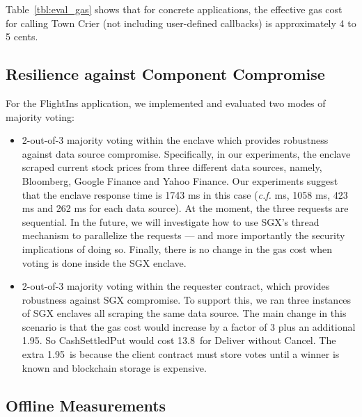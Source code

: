 Table~\ref{tbl:eval_gas} shows that for concrete applications, the effective gas cost
for calling Town Crier (not including user-defined callbacks) is approximately 4 to 5 cents.



\subsection{Resilience against Component Compromise}
\label{subsec:hedging}
For the {\sf FlightIns} application, 
we implemented and evaluated two modes of majority voting:
\begin{itemize}[leftmargin=3mm]
\item
2-out-of-3 majority voting within the enclave which provides robustness
against data source compromise.
Specifically, in our experiments, 
the enclave scraped current stock prices 
from three different data sources, 
namely, Bloomberg, Google Finance and Yahoo Finance.
Our experiments suggest that  
the enclave response time is 
1743 ms in this case ({\it c.f.} ms, 
1058 ms, 423 ms and 262  ms for 
each data source).
At the moment, the three requests 
are sequential. In the future, we will investigate how to 
use SGX's thread mechanism to parallelize the requests --- and more importantly
the security implications of doing so.
Finally, there is no change in the gas cost when voting is done
inside the SGX enclave.
\item
2-out-of-3 majority voting within the requester contract,
which provides robustness against 
SGX compromise.
To support this, we ran three instances of SGX enclaves all scraping
the same data source.  
The main change in this scenario is that 
the gas cost would increase by a factor of 3 plus an additional 1.95\textcent.
So {\sf CashSettledPut} would cost 13.8\textcent\ for Deliver without Cancel.
The extra 1.95\textcent\ is because the client contract must store votes
until a winner is known and blockchain storage is expensive.
\end{itemize}



\subsection{Offline Measurements}


